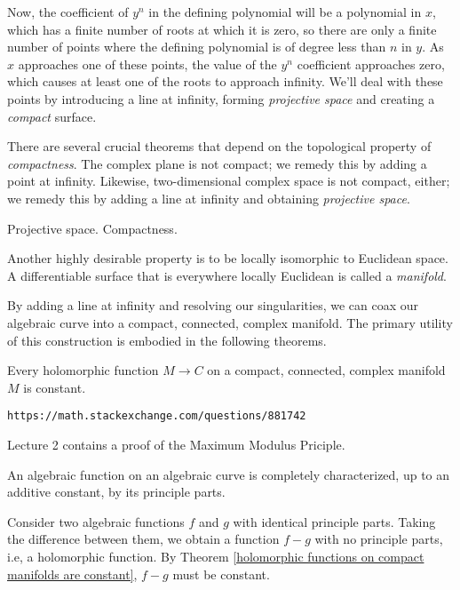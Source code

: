 Now, the coefficient of $y^n$ in the defining polynomial will be a
polynomial in $x$, which has a finite number of roots at which it is
zero, so there are only a finite number of points where the defining
polynomial is of degree less than $n$ in $y$.  As $x$ approaches one
of these points, the value of the $y^n$ coefficient approaches zero,
which causes at least one of the roots to approach infinity.  We'll
deal with these points by introducing a line at infinity, forming
{\it projective space} and creating a {\it compact} surface.

There are several crucial theorems that depend on the topological
property of {\it compactness}.  The complex plane is not compact; we
remedy this by adding a point at infinity.  Likewise, two-dimensional
complex space is not compact, either; we remedy this by adding a
line at infinity and obtaining {\it projective space}.

Projective space.  Compactness.

Another highly desirable property is to be locally isomorphic to
Euclidean space.  A differentiable surface that is everywhere locally
Euclidean is called a {\it manifold}.

By adding a line at infinity and resolving our singularities, we can
coax our algebraic curve into a compact, connected, complex manifold.
The primary utility of this construction is embodied in the following
theorems.

\theorem
\label{holomorphic functions on compact manifolds are constant}

Every holomorphic function $M \to C$ on a compact, connected, complex manifold $M$ is constant.

\proof

{\tt https://math.stackexchange.com/questions/881742}

\cite{guillemin} Lecture 2 contains a proof of the Maximum Modulus Priciple.

\endtheorem

\theorem

An algebraic function on an algebraic curve is completely characterized, up to an additive
constant, by its principle parts.

\proof

Consider two algebraic functions $f$ and $g$ with identical principle
parts.  Taking the difference between them, we obtain a function $f-g$
with no principle parts, i.e, a holomorphic function.  By
Theorem \ref{holomorphic functions on compact manifolds are constant},
$f-g$ must be constant.

